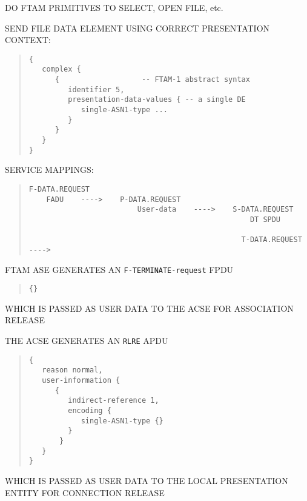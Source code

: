 \begin{bwslide}

\begin{nrtc}
\item	DO FTAM PRIMITIVES TO SELECT, OPEN FILE, etc.

\item	SEND FILE DATA ELEMENT USING CORRECT PRESENTATION CONTEXT:
\begin{quote}\small\begin{verbatim}
{
   complex {
      {                   -- FTAM-1 abstract syntax
         identifier 5,
         presentation-data-values { -- a single DE
            single-ASN1-type ...
         }
      }
   }
}
\end{verbatim}\end{quote}

\item	SERVICE MAPPINGS:
\begin{quote}\small\begin{verbatim}
F-DATA.REQUEST
    FADU    ---->    P-DATA.REQUEST
                         User-data    ---->    S-DATA.REQUEST
                                                   DT SPDU

                                                 T-DATA.REQUEST  ---->
\end{verbatim}\end{quote}
\end{nrtc}
\end{bwslide}


\begin{bwslide}

\begin{nrtc}
\item	FTAM ASE GENERATES AN \verb"F-TERMINATE-request" FPDU
\begin{quote}\small\begin{verbatim}
{}
\end{verbatim}\end{quote}

\item	WHICH IS PASSED AS USER DATA TO THE ACSE FOR ASSOCIATION RELEASE
\end{nrtc}
\end{bwslide}


\begin{bwslide}

\begin{nrtc}
\item	THE ACSE GENERATES AN \verb"RLRE" APDU
\begin{quote}\small\begin{verbatim}
{
   reason normal,
   user-information {
      {
         indirect-reference 1,
         encoding {
            single-ASN1-type {}
         }
       }
   }
}
\end{verbatim}\end{quote}

\item	WHICH IS PASSED AS USER DATA TO THE LOCAL PRESENTATION ENTITY FOR
	CONNECTION RELEASE
\end{nrtc}
\end{bwslide}


